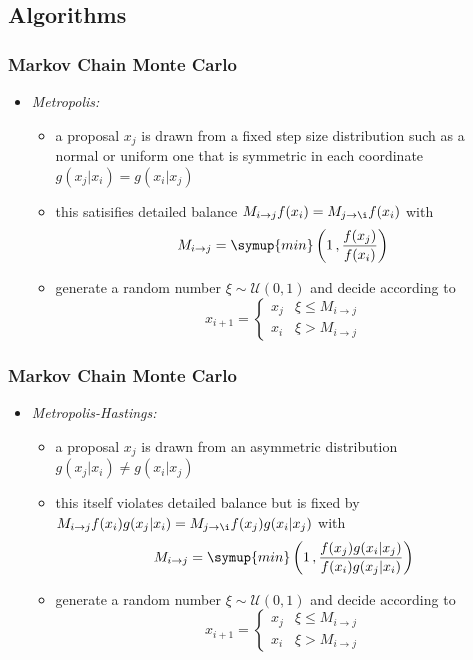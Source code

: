 	\subsection{Algorithms}

	\begin{frame}
		\frametitle{Markov Chain Monte Carlo}
		\begin{itemize}
			\item<2-> \itshape{Metropolis:}
			\begin{itemize}
				\item<3-> a proposal $x_j$ is drawn from a fixed step size distribution such as a normal or uniform one
						  that is symmetric in each coordinate $g(x_j|x_i) = g(x_i|x_j)$\vspace{0.5ex}
				\item<4-> this satisifies detailed balance $M_{i \to j}f(x_i) = M_{j \to \i}f(x_i)$ with
						  $$M_{i \to j} = \symup{min}\left(1\, , \frac{f(x_j)}{f(x_i)}\right)$$
				\item<5-> generate a random number $\xi \sim \mathcal{U}(0,1)$ and decide according to
						  $$x_{i+1} = \begin{cases}x_j & \xi \leq M_{i \to j} \\ x_i & \xi > M_{i \to j}\end{cases}$$
			\end{itemize}
		\end{itemize}
	\end{frame}

	\begin{frame}[noframenumbering]
		\frametitle{Markov Chain Monte Carlo}
		\begin{itemize}
			\item<2-> \itshape{Metropolis-Hastings:}
			\begin{itemize}
				\item<3-> a proposal $x_j$ is drawn from an asymmetric distribution $g(x_j|x_i) \neq g(x_i|x_j)$\vspace{0.5ex}
				\item<4-> this itself violates detailed balance but is fixed by $M_{i \to j}f(x_i)g(x_j|x_i) = M_{j \to \i}f(x_j)g(x_i|x_j)$ with
						  $$M_{i \to j} = \symup{min}\left(1\, , \frac{f(x_j)g(x_i|x_j)}{f(x_i)g(x_j|x_i)}\right)$$
				\item<5-> generate a random number $\xi \sim \mathcal{U}(0,1)$ and decide according to
						  $$x_{i+1} = \begin{cases}x_j & \xi \leq M_{i \to j} \\ x_i & \xi > M_{i \to j}\end{cases}$$
			\end{itemize}
		\end{itemize}
	\end{frame}

